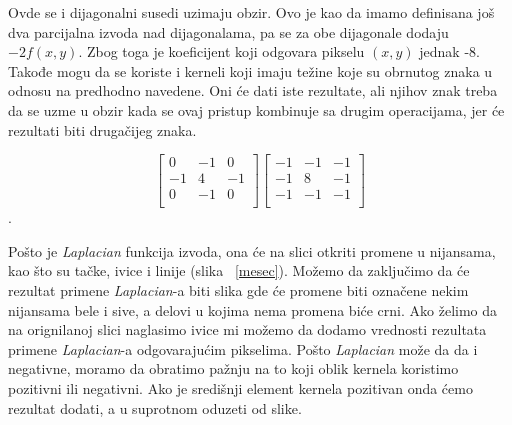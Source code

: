 \documentclass[a4paper,12pt,titlepage]{article}
\begin{document}
Ovde se i dijagonalni susedi uzimaju obzir. Ovo je kao da imamo definisana još dva parcijalna izvoda nad dijagonalama, pa se za obe dijagonale dodaju $-2f(x, y)$. Zbog toga je koeficijent koji odgovara pikselu $(x, y)$ jednak -8. Takođe mogu da se koriste i kerneli koji imaju težine koje su obrnutog znaka u odnosu na predhodno navedene. Oni će dati iste rezultate, ali njihov znak treba da se uzme u obzir kada se ovaj pristup kombinuje sa drugim operacijama, jer će rezultati biti drugačijeg znaka.

\[
\begin{bmatrix}
     0 & -1 & 0 \\
     -1 & 4 & -1 \\
     0 & -1 & 0 \\
\end{bmatrix}
\begin{bmatrix}
     -1 & -1 & -1 \\
     -1 & 8 & -1 \\
     -1 & -1 & -1 \\
\end{bmatrix}
\]. 

Pošto je \emph{Laplacian} funkcija izvoda, ona će na slici otkriti promene u nijansama, kao što su tačke, ivice i linije (slika ~\ref{mesec}). Možemo da zaključimo da će rezultat primene \emph{Laplacian}-a biti slika gde će promene biti označene nekim nijansama bele i sive, a delovi u kojima nema promena biće crni. Ako želimo da na orignilanoj slici naglasimo ivice mi možemo da dodamo vrednosti rezultata primene \emph{Laplacian}-a odgovarajućim pikselima. Pošto \emph{Laplacian} može da da i negativne, moramo da obratimo pažnju na to koji oblik kernela koristimo pozitivni ili negativni. Ako je središnji element kernela pozitivan onda ćemo rezultat dodati, a u suprotnom oduzeti od slike.
\end{document}
